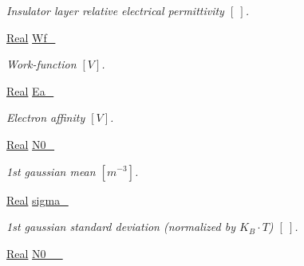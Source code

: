 \begin{DoxyCompactItemize}
\begin{DoxyCompactList}\small\item\em Insulator layer relative electrical permittivity $ \left[ ~ \right] $. \end{DoxyCompactList}\item 
\hypertarget{classParamList_a9121165703c9ef6b60fe469701a48fad}{\hyperlink{typedefs_8h_a060b837c3b4486ee35317744156f3da2}{Real} \hyperlink{classParamList_a9121165703c9ef6b60fe469701a48fad}{Wf\-\_\-}}\label{classParamList_a9121165703c9ef6b60fe469701a48fad}

\begin{DoxyCompactList}\small\item\em Work-\/function $ \left[ V \right] $. \end{DoxyCompactList}\item 
\hypertarget{classParamList_aed555e87b2a431b6ecabaf17813ed289}{\hyperlink{typedefs_8h_a060b837c3b4486ee35317744156f3da2}{Real} \hyperlink{classParamList_aed555e87b2a431b6ecabaf17813ed289}{Ea\-\_\-}}\label{classParamList_aed555e87b2a431b6ecabaf17813ed289}

\begin{DoxyCompactList}\small\item\em Electron affinity $ \left[ V \right] $. \end{DoxyCompactList}\item 
\hypertarget{classParamList_aa51672586248c54289ad6ac1a5d3c274}{\hyperlink{typedefs_8h_a060b837c3b4486ee35317744156f3da2}{Real} \hyperlink{classParamList_aa51672586248c54289ad6ac1a5d3c274}{N0\-\_\-}}\label{classParamList_aa51672586248c54289ad6ac1a5d3c274}

\begin{DoxyCompactList}\small\item\em 1st gaussian mean $ \left[ m^{-3} \right] $. \end{DoxyCompactList}\item 
\hypertarget{classParamList_a37293181f9beea97f75b133deb9d9119}{\hyperlink{typedefs_8h_a060b837c3b4486ee35317744156f3da2}{Real} \hyperlink{classParamList_a37293181f9beea97f75b133deb9d9119}{sigma\-\_\-}}\label{classParamList_a37293181f9beea97f75b133deb9d9119}

\begin{DoxyCompactList}\small\item\em 1st gaussian standard deviation (normalized by $ K_B \cdot T $) $ \left[ ~ \right] $. \end{DoxyCompactList}\item 
\hypertarget{classParamList_a5cd86383f9ae39d6a8851c5b470051eb}{\hyperlink{typedefs_8h_a060b837c3b4486ee35317744156f3da2}{Real} \hyperlink{classParamList_a5cd86383f9ae39d6a8851c5b470051eb}{N0\-\_\-\_\-}}\label{classParamList_a5cd86383f9ae39d6a8851c5b470051eb}


\end{DoxyCompactItemize}
